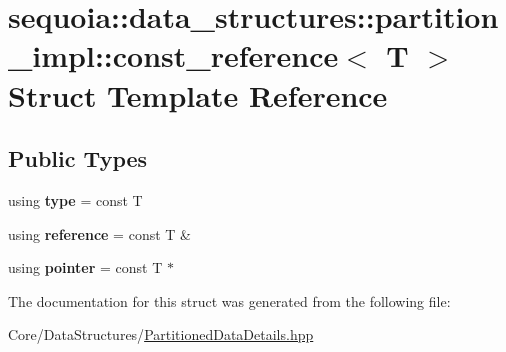 \hypertarget{structsequoia_1_1data__structures_1_1partition__impl_1_1const__reference}{}\section{sequoia\+::data\+\_\+structures\+::partition\+\_\+impl\+::const\+\_\+reference$<$ T $>$ Struct Template Reference}
\label{structsequoia_1_1data__structures_1_1partition__impl_1_1const__reference}
\subsection*{Public Types}
\begin{DoxyCompactItemize}
\item 
\mbox{\label{structsequoia_1_1data__structures_1_1partition__impl_1_1const__reference_aa0adc125c1ae7030d45528196fb14acb}} 
using {\bfseries type} = const T
\item 
\mbox{\label{structsequoia_1_1data__structures_1_1partition__impl_1_1const__reference_a2429943e70b5631037f7952ede05d240}} 
using {\bfseries reference} = const T \&
\item 
\mbox{\label{structsequoia_1_1data__structures_1_1partition__impl_1_1const__reference_a3c85ef512d573be4fc1d8a47db0fd0a6}} 
using {\bfseries pointer} = const T $\ast$
\end{DoxyCompactItemize}


The documentation for this struct was generated from the following file\+:\begin{DoxyCompactItemize}
\item 
Core/\+Data\+Structures/\mbox{\hyperlink{_partitioned_data_details_8hpp}{Partitioned\+Data\+Details.\+hpp}}\end{DoxyCompactItemize}

